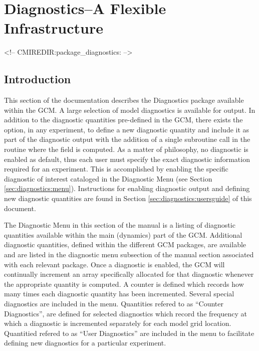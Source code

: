 \section{Diagnostics--A Flexible Infrastructure}
\label{sec:pkg:diagnostics}
\begin{rawhtml}
<!-- CMIREDIR:package_diagnostics: -->
\end{rawhtml}

\subsection{Introduction}

\noindent
This section of the documentation describes the Diagnostics package
available within the GCM.  A large selection of model diagnostics is
available for output.  In addition to the diagnostic quantities
pre-defined in the GCM, there exists the option, in any experiment, to
define a new diagnostic quantity and include it as part of the
diagnostic output with the addition of a single subroutine call in the
routine where the field is computed. As a matter of philosophy, no
diagnostic is enabled as default, thus each user must specify the
exact diagnostic information required for an experiment.  This is
accomplished by enabling the specific diagnostic of interest cataloged
in the Diagnostic Menu (see Section \ref{sec:diagnostics:menu}).
Instructions for enabling diagnostic output and defining new
diagnostic quantities are found in Section
\ref{sec:diagnostics:usersguide} of this document.

\noindent
The Diagnostic Menu in this section of the manual is a listing of
diagnostic quantities available within the main (dynamics) part of the
GCM. Additional diagnostic quantities, defined within the different
GCM packages, are available and are listed in the diagnostic menu
subsection of the manual section associated with each relevant
package. Once a diagnostic is enabled, the GCM will continually
increment an array specifically allocated for that diagnostic whenever
the appropriate quantity is computed.  A counter is defined which
records how many times each diagnostic quantity has been incremented.
Several special diagnostics are included in the menu. Quantities
refered to as ``Counter Diagnostics'', are defined for selected
diagnostics which record the frequency at which a diagnostic is
incremented separately for each model grid location.  Quantitied
refered to as ``User Diagnostics'' are included in the menu to
facilitate defining new diagnostics for a particular experiment.

